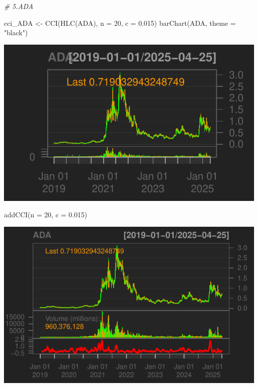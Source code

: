 \documentclass[]{tufte-handout}
\newenvironment{Shaded}{}{}
\newcommand{\AttributeTok}[1]{\textcolor[rgb]{0.49,0.56,0.16}{#1}}
\newcommand{\CommentTok}[1]{\textcolor[rgb]{0.38,0.63,0.69}{\textit{#1}}}
\newcommand{\DecValTok}[1]{\textcolor[rgb]{0.25,0.63,0.44}{#1}}
\newcommand{\FloatTok}[1]{\textcolor[rgb]{0.25,0.63,0.44}{#1}}
\newcommand{\FunctionTok}[1]{\textcolor[rgb]{0.02,0.16,0.49}{#1}}
\newcommand{\NormalTok}[1]{#1}
\newcommand{\OtherTok}[1]{\textcolor[rgb]{0.00,0.44,0.13}{#1}}
\newcommand{\StringTok}[1]{\textcolor[rgb]{0.25,0.44,0.63}{#1}}
\begin{document}
\begin{Shaded}
\begin{Highlighting}[]
\CommentTok{\# 5.ADA}

\NormalTok{cci\_ADA }\OtherTok{\textless{}{-}} \FunctionTok{CCI}\NormalTok{(}\FunctionTok{HLC}\NormalTok{(ADA), }\AttributeTok{n =} \DecValTok{20}\NormalTok{, }\AttributeTok{c =} \FloatTok{0.015}\NormalTok{)}
\FunctionTok{barChart}\NormalTok{(ADA, }\AttributeTok{theme =} \StringTok{"black"}\NormalTok{)}
\end{Highlighting}
\end{Shaded}

\includegraphics{cripto_update_files/figure-latex/unnamed-chunk-12-9}

\begin{Shaded}
\begin{Highlighting}[]
\FunctionTok{addCCI}\NormalTok{(}\AttributeTok{n =} \DecValTok{20}\NormalTok{, }\AttributeTok{c =} \FloatTok{0.015}\NormalTok{)}
\end{Highlighting}
\end{Shaded}

\includegraphics{cripto_update_files/figure-latex/unnamed-chunk-12-10}
\end{document}
